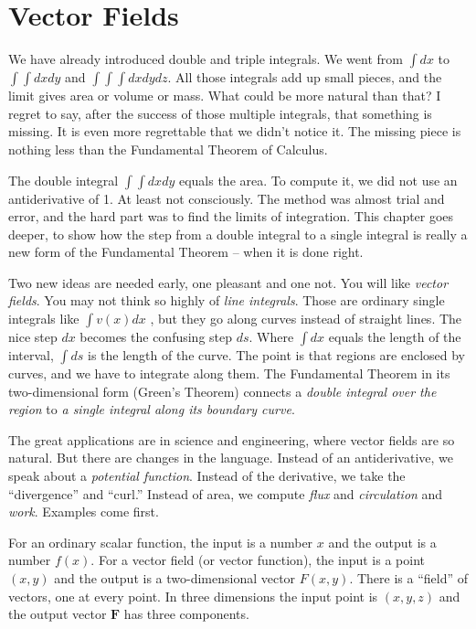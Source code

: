 \usepackage{mdframed}
\section{Vector Fields}\label{sec:vector_fields}
We have already introduced double and triple integrals. We went from $\int dx$ to $\int \int  dx dy$ and
$\int \int \int dx dy dz$. All those integrals add up small pieces, and the limit gives area or volume
or mass. What could be more natural than that? I regret to say, after the success of
those multiple integrals, that something is missing. It is even more regrettable that
we didn't notice it. The missing piece is nothing less than the Fundamental Theorem
of Calculus.

The double integral $\int \int dx dy$ equals the area. To compute it, we did not use an
antiderivative of 1. At least not consciously. The method was almost trial and error,
and the hard part was to find the limits of integration. This chapter goes deeper, to
show how the step from a double integral to a single integral is really a new form of
the Fundamental Theorem -- when it is done right.

Two new ideas are needed early, one pleasant and one not. You will like \emph{vector
fields}. You may not think so highly of \emph{line integrals}. Those are ordinary single integrals
like $\int v(x) dx$ , but they go along curves instead of straight lines. The nice step $dx$
becomes the confusing step $ds$. Where $\int dx$ equals the length of the interval, $\int ds$ is
the length of the curve. The point is that regions are enclosed by curves, and we have
to integrate along them. The Fundamental Theorem in its two-dimensional form
(Green's Theorem) connects a \emph{double integral over the region} to \emph{a single integral along
its boundary curve}.

The great applications are in science and engineering, where vector fields are so
natural. But there are changes in the language. Instead of an antiderivative, we speak
about a \emph{potential function}. Instead of the derivative, we take the ``divergence'' and
``curl.'' Instead of area, we compute \emph{flux} and \emph{circulation} and \emph{work}. Examples come
first.

For an ordinary scalar function, the input is a number $x$ and the output is a number
$f(x)$. For a vector field (or vector function), the input is a point $(x, y)$ and the output
is a two-dimensional vector $F(x, y)$. There is a ``field'' of vectors, one at every point.
In three dimensions the input point is $(x, y, z)$ and the output vector $\mathbf{F}$ has three
components.

